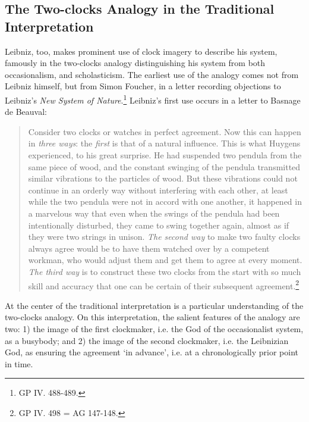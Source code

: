 \documentclass{article}
\begin{document}
\subsection{The Two-clocks Analogy in the Traditional Interpretation
}

Leibniz, too, makes prominent use of clock imagery to describe his
system, famously in the two-clocks analogy distinguishing his system
from both occasionalism, and scholasticism. The earliest use of the
analogy comes not from Leibniz himself, but from Simon Foucher, in a
letter recording objections to Leibniz's \emph{New System of
Nature}.\footnote{GP IV. 488-489.} Leibniz's first use occurs in a
letter to Basnage de Beauval:

\begin{quote}
Consider two clocks or watches in perfect agreement. Now this can happen
in \emph{three ways}: the \emph{first} is that of a natural influence.
This is what Huygens experienced, to his great surprise. He had
suspended two pendula from the same piece of wood, and the constant
swinging of the pendula transmitted similar vibrations to the particles
of wood. But these vibrations could not continue in an orderly way
without interfering with each other, at least while the two pendula were
not in accord with one another, it happened in a marvelous way that even
when the swings of the pendula had been intentionally disturbed, they
came to swing together again, almost as if they were two strings in
unison. \emph{The second way} to make two faulty clocks always agree
would be to have them watched over by a competent workman, who would
adjust them and get them to agree at every moment. \emph{The third way}
is to construct these two clocks from the start with so much skill and
accuracy that one can be certain of their subsequent
agreement.\footnote{GP IV. 498 = AG 147-148.}
\end{quote}

At the center of the traditional interpretation is a particular
understanding of the two-clocks analogy. On this interpretation, the
salient features of the analogy are two: 1) the image of the first
clockmaker, i.e. the God of the occasionalist system, as a busybody; and
2) the image of the second clockmaker, i.e. the Leibnizian God, as
ensuring the agreement `in advance', i.e. at a chronologically prior
point in time.
\end{document}
